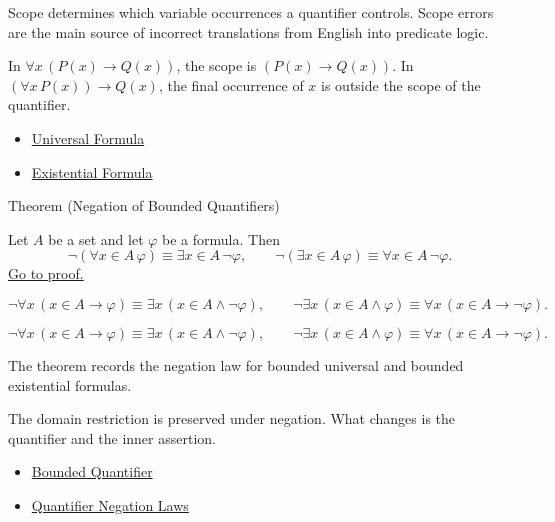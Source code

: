 \begin{remark*}[Interpretation]
Scope determines which variable occurrences a quantifier controls. Scope errors
are the main source of incorrect translations from English into predicate
logic.
\end{remark*}

\begin{remark*}[Examples]
In \(\forall x\,(P(x)\to Q(x))\), the scope is \((P(x)\to Q(x))\). In
\((\forall x\,P(x))\to Q(x)\), the final occurrence of \(x\) is outside the
scope of the quantifier.
\end{remark*}

\begin{dependencies}
\begin{itemize}
  \item \hyperref[def:universal-q]{Universal Formula}
  \item \hyperref[def:existential-q]{Existential Formula}
\end{itemize}
\end{dependencies}

\begin{theorembox}{Theorem (Negation of Bounded Quantifiers)}
\begin{theorem}
\label{thm:neg-bounded}
Let \(A\) be a set and let \(\varphi\) be a formula. Then
\[
\neg(\forall x\in A\,\varphi)\equiv \exists x\in A\,\neg\varphi,
\qquad
\neg(\exists x\in A\,\varphi)\equiv \forall x\in A\,\neg\varphi.
\]
\hyperref[prf:neg-bounded]{Go to proof.}
\end{theorem}
\end{theorembox}

\begin{remark*}
\[
\neg\forall x\,(x\in A\to\varphi)
\equiv
\exists x\,(x\in A\land\neg\varphi),
\qquad
\neg\exists x\,(x\in A\land\varphi)
\equiv
\forall x\,(x\in A\to\neg\varphi).
\]
\end{remark*}

\begin{remark*}
\[
\neg\forall x\,(x\in A\to\varphi)
\equiv
\exists x\,(x\in A\land\neg\varphi),
\qquad
\neg\exists x\,(x\in A\land\varphi)
\equiv
\forall x\,(x\in A\to\neg\varphi).
\]
\end{remark*}



\begin{remark*}[Interpretation]
The theorem records the negation law for bounded universal and bounded
existential formulas.

The domain restriction is preserved under negation. What changes is the
quantifier and the inner assertion.
\end{remark*}

\begin{dependencies}
\begin{itemize}
  \item \hyperref[def:bounded-q]{Bounded Quantifier}
  \item \hyperref[thm:qneg]{Quantifier Negation Laws}
\end{itemize}
\end{dependencies}
